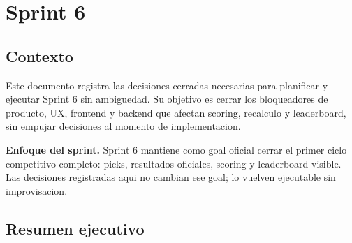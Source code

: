 \section{Sprint 6}

\subsection{Contexto}

Este documento registra las decisiones cerradas necesarias para planificar y ejecutar Sprint 6 sin ambiguedad. Su objetivo es cerrar los bloqueadores de producto, UX, frontend y backend que afectan scoring, recalculo y leaderboard, sin empujar decisiones al momento de implementacion.

\begin{docnote}
\textbf{Enfoque del sprint.} Sprint 6 mantiene como goal oficial cerrar el primer ciclo competitivo completo: picks, resultados oficiales, scoring y leaderboard visible. Las decisiones registradas aqui no cambian ese goal; lo vuelven ejecutable sin improvisacion.
\end{docnote}

\subsection{Resumen ejecutivo}

